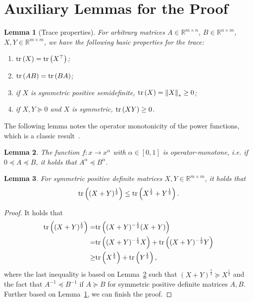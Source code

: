 \documentclass{article}
\newtheorem{lemma}{Lemma}
\theoremstyle{remark}
\newcommand{\Norm}[1]{\left\|#1\right\|}
\newcommand{\tr}[1]{{\rm tr}\left( #1 \right)}
\newcommand{\RR}{\mathbb{R}}
\begin{document}
\section{Auxiliary Lemmas for the Proof}
\begin{lemma}[Trace properties]\label{lem:trace_properties}
    For arbitrary matrices $A \in \RR^{m\times n}$, $B \in \RR^{n\times m}$, $X,Y \in \RR^{m\times m}$, we have the following basic properties for the trace:
    \begin{enumerate}
        \item $\tr{X} = \tr{X^\top}$;
        \item $\tr{AB} = \tr{B A}$;
        \item if $X$ is symmetric positive semidefinite, $\tr{X} = \Norm{X}_* \ge 0$;
        \item if $X, Y \succeq 0$ and $X$ is symmetric, $\tr{XY} \ge 0$.
    \end{enumerate}
\end{lemma}

The following lemma notes the operator monotonicity of the power functions, which is a classic result~\citep{lowner1934monotone,ando2004geometric,gupta2018shampoo}.
\begin{lemma}\label{lem:matrix_operator_monotone}
    The function $f:x \to x^\alpha$ with $\alpha \in [0,1]$ is operator-monotone, i.e. if $0 \preceq A \preceq B$, it holds that $A^\alpha \preceq B^\alpha$.
\end{lemma}

\begin{lemma}\label{lem:square_trace_sum_2}
    For symmetric positive definite matrices $X,Y\in \RR^{m\times m}$, it holds that
    \begin{align*}
        \tr{(X+Y)^{\frac{1}{2}} } \le \tr{X^{\frac{1}{2}} + Y^{\frac{1}{2}}} .
    \end{align*}
\end{lemma}
\begin{proof}
    It holds that
    \begin{align*}
        \tr{(X+Y)^{\frac{1}{2}}} =& \tr{(X+Y)^{-\frac{1}{2}} (X+Y) } \\
        =& \tr{(X+Y)^{-\frac{1}{2}} X} + \tr{(X+Y)^{-\frac{1}{2}} Y } \\
        \ge& \tr{X^{\frac{1}{2}}} + \tr{Y^{\frac{1}{2}}} ,
    \end{align*}
    where the last inequality is based on Lemma~\ref{lem:matrix_operator_monotone} such that $(X+Y)^{\frac{1}{2}} \succeq X^{\frac{1}{2}}$ and the fact that $A^{-1} \preceq B^{-1}$ if $A \succeq B$ for symmetric positive definite matrices $A,B$. Further based on Lemma~\ref{lem:trace_properties}, we can finish the proof.
\end{proof}
\end{document}
